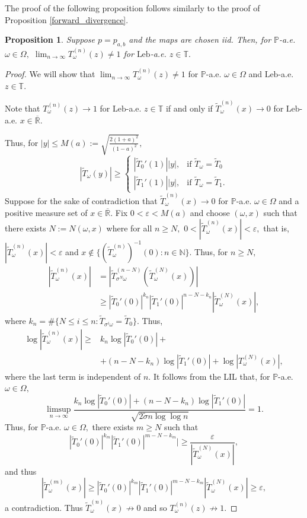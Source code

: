 \documentclass[12pt,reqno]{amsart}
\numberwithin{theorem}{section}
\newtheorem{proposition}[theorem]{Proposition}%
\begin{document}
The proof of the following proposition follows similarly to the proof of Proposition \ref{forward_divergence}.
\begin{proposition}
    Suppose $p=p_{a,b}$ and the maps are chosen iid. Then, for $\mathbb{P}$-a.e. $\omega\in\Omega,$ $\lim_{n\to\infty}T_{\omega}^{(n)}(z)\neq1$ for $\text{Leb}$-a.e. $z\in\mathbb{T}.$
\end{proposition}
\begin{proof}
    We will show that $\lim_{n\to\infty}T_{\omega}^{(n)}(z)\neq1$ for $\mathbb{P}$-a.e. $\omega\in\Omega$ and $\text{Leb}$-a.e. $z\in\mathbb{T}.$ 
    
     Note that $T_{\omega}^{(n)}(z)\to1$ for $\text{Leb}$-a.e. $z\in\mathbb{T}$ if and only if $\tilde{T}_{\omega}^{(n)}(x)\to0$ for $\text{Leb}$-a.e. $x\in\overline{\mathbb{R}}.$

       Thus, for $|y|\le M(a):=\sqrt{\frac{2(1+a)^2}{(1-a)^2}},$
      $$|\tilde{T}_{\omega}(y)|\ge\begin{cases}
        |\tilde{T}_{0}'(1)||y|,&\text{if }\tilde{T}_{\omega}=\tilde{T}_{0}\\|\tilde{T}_{1}'(1)||y|,&\text{if }\tilde{T}_{\omega}=\tilde{T}_{1}.
    \end{cases}$$ Suppose for the sake of contradiction that $\tilde{T}_{\omega}^{(n)}(x)\to0$ for $\mathbb{P}$-a.e. $\omega\in\Omega$ and a positive measure set of $x\in\overline{\mathbb{R}}.$  Fix $0<\varepsilon<M(a)$ and choose $(\omega, x)$  such that there exists $N:=N(\omega,x)$ where for all $n\ge N,$ $0<|\tilde{T}_{\omega}^{(n)}(x)|<\varepsilon,$ that is, $|\tilde{T}_{\omega}^{(n)}(x)|<\varepsilon$ and $x\not\in\{(\tilde{T}_{\omega}^{(n)})^{-1}(0):n\in\mathbb{N}\}.$ Thus, for $n\ge N,$ \begin{align*}|\tilde{T}_{\omega}^{(n)}(x)|&=|\tilde{T}_{\sigma^{N}\omega}^{(n-N)}(\tilde{T}_{\omega}^{(N)}(x))|\\&\ge|\tilde{T}_{0}'(0)|^{k_n}|\tilde{T}_{1}'(0)|^{n-N-k_n}|\tilde{T}_{\omega}^{(N)}(x)|,\end{align*} where $k_n=\#\{N\le i\le n:\tilde{T}_{\sigma^{i}\omega}=\tilde{T}_{0}\}.$ Thus, \begin{align*}\log|\tilde{T}_{\omega}^{(n)}(x)|\ge &k_n\log|\tilde{T}_{0}'(0)|+\\&+(n-N-k_n)\log|\tilde{T}_{1}'(0)|+\log|T_{\omega}^{(N)}(x)|,\end{align*} where the last term is independent of $n.$ It follows from the LIL that, for $\mathbb{P}$-a.e. $\omega\in\Omega,$ $$\limsup_{n\to\infty}\frac{k_n\log|\tilde{T}_{0}'(0)|+(n-N-k_n)\log|\tilde{T}_{1}'(0)|}{\sqrt{2\tilde{\sigma}n\log\log n}}=1.$$ Thus, for $\mathbb{P}$-a.e. $\omega\in\Omega,$ there exists $m\ge N$ such that $$|\tilde{T}_{0}'(0)|^{k_m}|\tilde{T}_{1}'(0)|^{m-N-k_m}|\ge\frac{\varepsilon}{|\tilde{T}_{\omega}^{(N)}(x)|},$$ and thus $$|\tilde{T}_{\omega}^{(m)}(x)|\ge|\tilde{T}_{0}'(0)|^{k_m}|\tilde{T}_{1}'(0)|^{m-N-k_m}|\tilde{T}_{\omega}^{(N)}(x)|\ge\varepsilon,$$ a contradiction. Thus $\tilde{T}_{\omega}^{(n)}(x)\not\to0$ and so $T_{\omega}^{(n)}(z)\not\to1.$ 
\end{proof}
\end{document}
